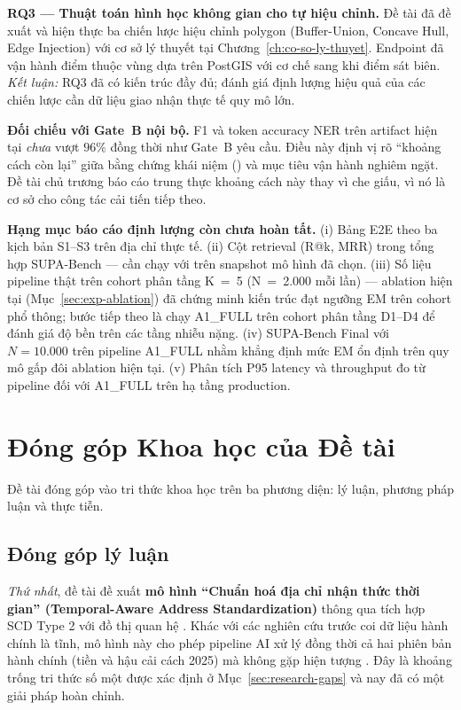 \textbf{RQ3 --- Thuật toán hình học không gian cho tự hiệu chỉnh.} Đề tài đã đề xuất và hiện thực ba chiến lược hiệu chỉnh polygon (Buffer-Union, Concave Hull, Edge Injection) với cơ sở lý thuyết tại Chương~\ref{ch:co-so-ly-thuyet}. Endpoint  đã vận hành điểm thuộc vùng dựa trên PostGIS với cơ chế  sang  khi điểm sát biên. \emph{Kết luận:} RQ3 đã có kiến trúc đầy đủ; đánh giá định lượng hiệu quả của các chiến lược cần dữ liệu giao nhận thực tế quy mô lớn.

\textbf{Đối chiếu với Gate~B nội bộ.} F1 và token accuracy NER trên artifact hiện tại \emph{chưa} vượt \(96\%\) đồng thời như Gate~B yêu cầu. Điều này định vị rõ ``khoảng cách còn lại'' giữa bằng chứng khái niệm () và mục tiêu vận hành nghiêm ngặt. Đề tài chủ trương báo cáo trung thực khoảng cách này thay vì che giấu, vì nó là cơ sở cho công tác cải tiến tiếp theo.

\textbf{Hạng mục báo cáo định lượng còn chưa hoàn tất.} (i) Bảng E2E theo ba kịch bản S1--S3 trên địa chỉ thực tế. (ii) Cột retrieval (R@k, MRR) trong tổng hợp SUPA-Bench --- cần chạy  với  trên snapshot mô hình đã chọn. (iii) Số liệu pipeline thật trên cohort phân tầng K~=~5 (N~=~2.000 mỗi lần) --- ablation hiện tại (Mục~\ref{sec:exp-ablation}) đã chứng minh kiến trúc đạt ngưỡng EM trên cohort phổ thông; bước tiếp theo là chạy A1\_FULL trên cohort phân tầng D1--D4 để đánh giá độ bền trên các tầng nhiễu nặng. (iv) SUPA-Bench Final với \(N = 10.000\) trên pipeline A1\_FULL nhằm khẳng định mức EM ổn định trên quy mô gấp đôi ablation hiện tại. (v) Phân tích P95 latency và throughput đo từ pipeline đối với A1\_FULL trên hạ tầng production.

\section{Đóng góp Khoa học của Đề tài}
\label{sec:concl-contributions}

Đề tài đóng góp vào tri thức khoa học trên ba phương diện: lý luận, phương pháp luận và thực tiễn.

\subsection{Đóng góp lý luận}
\label{sec:concl-theoretical}

\emph{Thứ nhất}, đề tài đề xuất \textbf{mô hình ``Chuẩn hoá địa chỉ nhận thức thời gian'' (Temporal-Aware Address Standardization)} thông qua tích hợp SCD Type 2 \cite{kimball2013} với đồ thị quan hệ . Khác với các nghiên cứu trước coi dữ liệu hành chính là tĩnh, mô hình này cho phép pipeline AI xử lý đồng thời cả hai phiên bản hành chính (tiền và hậu cải cách 2025) mà không gặp hiện tượng . Đây là khoảng trống tri thức số một được xác định ở Mục~\ref{sec:research-gaps} và nay đã có một giải pháp hoàn chỉnh.

